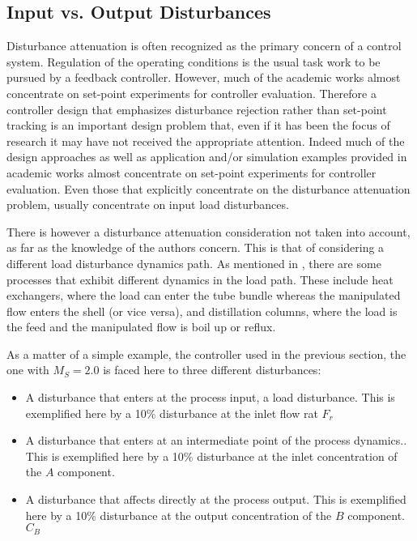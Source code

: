 \subsection{Input vs. Output Disturbances}
%
Disturbance attenuation is often recognized as the primary concern of a control system. Regulation of the operating conditions is the usual task work to be pursued by a feedback controller. However, much of the academic works almost concentrate on set-point experiments for controller evaluation.  Therefore a controller design that emphasizes disturbance rejection rather than set-point tracking is an important design problem that, even if it has been the focus of research it may have not received the appropriate attention. Indeed much of the design approaches as well as application and/or simulation examples provided in academic works almost concentrate on set-point experiments for controller evaluation. Even those that explicitly concentrate on the disturbance attenuation problem, usually concentrate on input load disturbances.

There is however a disturbance attenuation consideration not taken into account, as far as the knowledge of the authors concern. This is that of considering a different load disturbance dynamics path. As mentioned in \cite{Shinskey2002}, there are some processes that exhibit different dynamics in the load path. These include heat exchangers, where the load can enter the tube bundle whereas the manipulated flow enters the shell (or vice versa), and distillation columns, where the load is the feed and the manipulated flow is boil up or reflux.

As a matter of a simple example, the controller used in the previous section, the one with $M_S=2.0$ is faced here to three different disturbances:
%
\begin{itemize}
\item A disturbance that  enters at the process input, a load disturbance. This is exemplified here by a 10\% disturbance at the inlet flow rat $F_r$ 
\item A disturbance that enters at  an intermediate point of the process dynamics.. This is exemplified here by a 10\% disturbance at the inlet concentration of the $A$ component.
\item A disturbance that affects directly at the process output. This is exemplified here by a 10\% disturbance at the output concentration of the $B$ component. $C_B$
 \end{itemize} 

